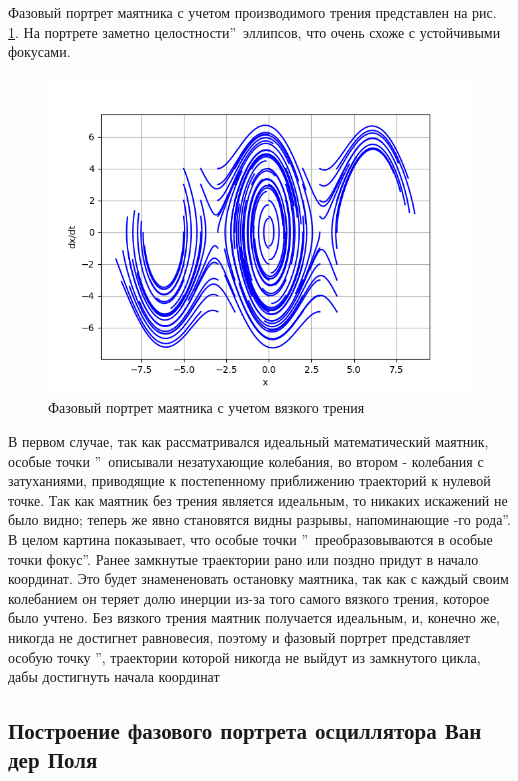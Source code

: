 Фазовый портрет маятника с учетом производимого трения представлен на рис. \ref{fig:20}.
На портрете заметно  целостности\textquotedblright\ эллипсов, что очень схоже с устойчивыми фокусами. 

\begin{figure}[H]
	\centering
	\includegraphics[width=0.7\linewidth]{body/images/Pendulum-system-with-drag.png}
	\caption{Фазовый портрет маятника с учетом вязкого трения}
	\label{fig:20}
\end{figure}

В первом случае, так как рассматривался идеальный математический маятник, особые точки \textquotedblright\ описывали незатухающие колебания,
во втором - колебания с затуханиями, приводящие к постепенному приближению траекторий к нулевой точке.
Так как маятник без трения является идеальным, то никаких искажений не было видно; теперь же явно становятся видны разрывы,
напоминающие -го рода\textquotedblright. В целом картина показывает, что особые точки \textquotedblright\ 
преобразовываются в особые точки  фокус\textquotedblright. Ранее замкнутые траектории рано или поздно придут в начало координат.
Это будет знамененовать остановку маятника, так как с каждый своим колебанием он теряет долю инерции из-за того самого вязкого трения, которое было учтено.
Без вязкого трения маятник получается идеальным, и, конечно же, никогда не достигнет равновесия, поэтому и фазовый портрет представляет особую точку
\textquotedblleftЦентр\textquotedblright, траектории которой никогда не выйдут из замкнутого цикла, дабы достигнуть начала координат

\subsection{Построение фазового портрета осциллятора Ван дер Поля}


